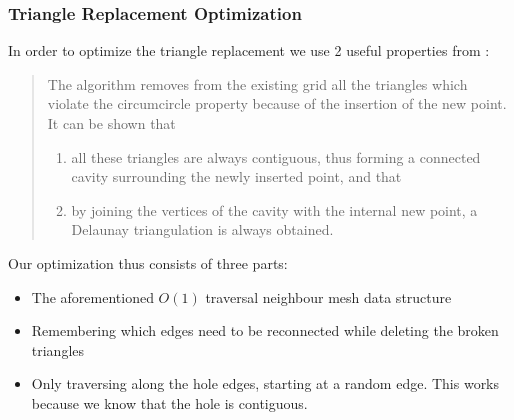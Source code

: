 \subsubsection{Triangle Replacement Optimization}
In order to optimize the triangle replacement we use 2 useful properties from \cite{Rebay1993}:
\begin{quote}
    The algorithm removes from the existing grid all the triangles which violate the circumcircle property because of the insertion of the new point.\\
    It can be shown that
    \begin{enumerate}
        \item all these triangles are always contiguous, thus forming a connected cavity surrounding the newly inserted point, and that
        \item by joining the vertices of the cavity with the internal new point, a Delaunay triangulation is always obtained.
    \end{enumerate}
\end{quote}
Our optimization thus consists of three parts:
\begin{itemize}
    \item The aforementioned $O(1)$ traversal neighbour mesh data structure
    \item Remembering which edges need to be reconnected while deleting the broken triangles
    \item Only traversing along the hole edges, starting at a random edge. This works because we know that the hole is contiguous.
\end{itemize}
\newpage
